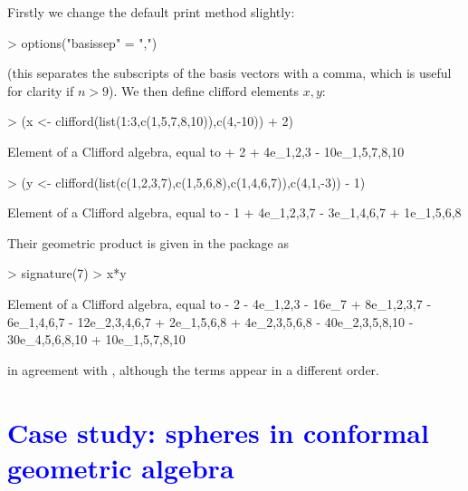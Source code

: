 \documentclass{birkjour}
\theoremstyle{definition}
\theoremstyle{remark}
\numberwithin{equation}{section}
\begin{document}
Firstly we change the default print method slightly:

\begin{Schunk}
\begin{Sinput}
> options("basissep" = ",")
\end{Sinput}
\end{Schunk}

(this separates the subscripts of the basis vectors with a comma,
which is useful for clarity if $n>9$).  We then define clifford
elements $x,y$:

\begin{Schunk}
\begin{Sinput}
> (x <- clifford(list(1:3,c(1,5,7,8,10)),c(4,-10)) + 2)
\end{Sinput}
\begin{Soutput}
Element of a Clifford algebra, equal to
+ 2 + 4e_1,2,3 - 10e_1,5,7,8,10
\end{Soutput}
\begin{Sinput}
> (y <- clifford(list(c(1,2,3,7),c(1,5,6,8),c(1,4,6,7)),c(4,1,-3)) - 1)
\end{Sinput}
\begin{Soutput}
Element of a Clifford algebra, equal to
- 1 + 4e_1,2,3,7 - 3e_1,4,6,7 + 1e_1,5,6,8
\end{Soutput}
\end{Schunk}

Their geometric product is given in the package as

\begin{Schunk}
\begin{Sinput}
> signature(7)
> x*y
\end{Sinput}
\begin{Soutput}
Element of a Clifford algebra, equal to
- 2 - 4e_1,2,3 - 16e_7 + 8e_1,2,3,7 - 6e_1,4,6,7 - 12e_2,3,4,6,7 +
2e_1,5,6,8 + 4e_2,3,5,6,8 - 40e_2,3,5,8,10 - 30e_4,5,6,8,10 +
10e_1,5,7,8,10
\end{Soutput}
\end{Schunk}

in agreement with \cite{ablamowicz2012}, although the terms appear in
a different order.


\section{\textcolor{blue}{Case study: spheres in conformal geometric algebra}}
\end{document}
